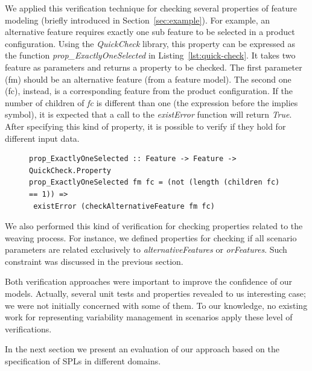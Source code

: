 \documentclass{acm_proc_article-sp}
\begin{document}

We applied this verification technique for checking several properties of feature modeling (briefly introduced in Section~\ref{sec:example}). For example, an alternative feature requires exactly one sub feature to be selected in a product configuration. Using the \emph{QuickCheck} library, this property can be expressed as the function \emph{prop\_ExactlyOneSelected} in Listing~\ref{lst:quick-check}. 
It takes two feature as parameters and returns a property to be checked. The first parameter (fm) should be an alternative feature (from a feature model). The second one (fc), instead, is a corresponding feature from the product configuration. If the number of children of \emph{fc} is different than one (the expression before the implies symbol), it is expected that a call to the \emph{existError} function will return \emph{True}. After specifying this kind of property, it is possible to verify if they hold for different input data.  

\begin{figure}
 \begin{lstlisting}[belowskip=10pt,frame=tb,caption={Example of QuickCheck property},label=lst:quick-check]
prop_ExactlyOneSelected :: Feature -> Feature -> QuickCheck.Property 
prop_ExactlyOneSelected fm fc = (not (length (children fc) == 1)) => 
 existError (checkAlternativeFeature fm fc) 
\end{lstlisting}
\end{figure}

We also performed this kind of verification for checking properties related to the weaving process. For instance, we defined properties for checking if all scenario parameters are related exclusively to \emph{alternativeFeatures} or \emph{orFeatures}. Such constraint was discussed in the previous section.  

Both verification approaches were important to improve the confidence of our models. Actually, several unit tests and properties revealed to us interesting case; we were not initially concerned with some of them. To our knowledge, no existing work for representing variability management in scenarios apply these level of verifications.

In the next section we present an evaluation of our approach based on the 
specification of SPLs in different domains. 
\end{document}
